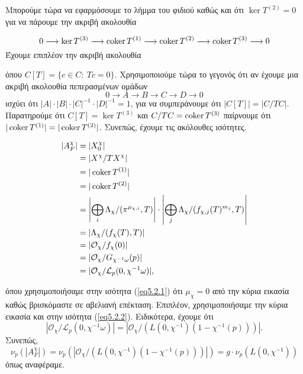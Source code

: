 \noindent Μπορούμε τώρα να εφαρμόσουμε το λήμμα του φιδιού καθώς και ότι $\ker T^{(2)} = 0$ για να πάρουμε την ακριβή ακολουθία

$$0\longrightarrow \ker T^{(3)}  \longrightarrow \operatorname{coker} T^{(1)} \longrightarrow \operatorname{coker} T^{(2)} \longrightarrow \operatorname{coker} T^{(3)} \longrightarrow 0$$ Έχουμε επιπλέον την ακριβή ακολουθία

\begin{figure}[H]
    \centering
\end{figure} 
\noindent όπου $C[T] = \{c \in C: \ Tc = 0\}$. Χρησιμοποιούμε τώρα το γεγονός ότι αν έχουμε μια ακριβή ακολουθία πεπερασμένων ομάδων
$$0 \longrightarrow A \longrightarrow B \longrightarrow C \longrightarrow D \longrightarrow 0$$ ισχύει ότι $|A| \cdot |B| \cdot |C|^{-1} \cdot |D|^{-1} = 1$, για να συμπεράνουμε ότι $|C[T]| = |C/TC|$. Παρατηρούμε ότι $C[T] = \ker T^{(3)}$ και $C/TC = \operatorname{coker} T^{(3)}$ παίρνουμε ότι $|\operatorname{coker} T^{(1)}| = |\operatorname{coker} T^{(2)}|$. Συνεπώς, έχουμε τις ακόλουθες ισότητες.

\begin{align}
    |A^\chi_F| &= |X^\chi_0| \nonumber \\
    &= |X^\chi / TX^\chi| \nonumber\\
    &= |\operatorname{coker} T^{(1)} | \nonumber\\
    &= |\operatorname{coker} T^{(2)} | \nonumber\\
    &= \left| \bigoplus\limits_i \Lambda_\chi / (\pi^{\mu_{\chi,i}}, T) \right| \cdot \left|\bigoplus\limits_j \Lambda_\chi / (f_{\chi,j}(T)^{m_j}, T) \right| \nonumber \\
    &= |\Lambda_\chi/(f_\chi(T),T)| \label{eq5.2.1} \\
    &= |\mathcal{O}_\chi /f_\chi(0)| \nonumber\\
    &= |\mathcal{O}_\chi/G_{\chi^{-1}\omega}(p)| \label{eq5.2.2}\\
    &= |\mathcal{O}_\chi / \mathcal{L}_p (0,\chi^{-1}\omega)|, \nonumber
\end{align}

\noindent όπου χρησιμοποιήσαμε στην ισότητα (\ref{eq5.2.1}) ότι $\mu_\chi = 0$ από την κύρια εικασία καθώς βρισκόμαστε σε αβελιανή επέκταση. Επιπλέον, χρησιμοποιήσαμε την κύρια εικασία και στην ισότητα (\ref{eq5.2.2}). Ειδικότερα, έχουμε ότι 
$$|\mathcal{O}_\chi / \mathcal{L}_p (0,\chi^{-1}\omega)| = |\mathcal{O}_\chi / \left( L(0,\chi^{-1})(1-\chi^{-1}(p))\right) |.$$ Συνεπώς,
$$ \nu_p (|A^\chi_F|) = \nu_p \left(\left| \mathcal{O}_\chi / \left( L(0,\chi^{-1})(1-\chi^{-1}(p))\right)\right|\right) = g \cdot \nu_p (L(0,\chi^{-1}))$$ όπως αναφέραμε. 
